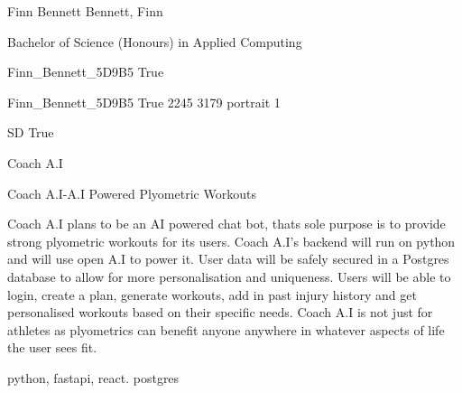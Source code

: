 \documentclass[twoside]{report}
\begin{document}
\begingroup{}\relax



\def\Key{Finn_Bennett_5D9B5}

{Finn Bennett}
{Bennett, Finn}

{Bachelor of Science (Honours) in Applied Computing}

{Finn_Bennett_5D9B5}
{True}

{Finn_Bennett_5D9B5}
{True}
{2245}
{3179}
{portrait}
{1}

{SD}
{True}

{Coach A.I}

{Coach A.I-A.I Powered Plyometric Workouts}

{Coach A.I plans to be an AI powered chat bot, thats sole purpose is to provide strong plyometric workouts for its users. Coach A.I's backend will run on python and will use open A.I to power it. User data will be safely secured in a Postgres database to allow for more personalisation and uniqueness. Users will be able to login, create a plan, generate workouts, add in past injury history and get personalised workouts based on their specific needs. Coach A.I is not just for athletes as plyometrics can benefit anyone anywhere in whatever aspects of life the user sees fit.}

{python, fastapi, react. postgres}
\end{document}
